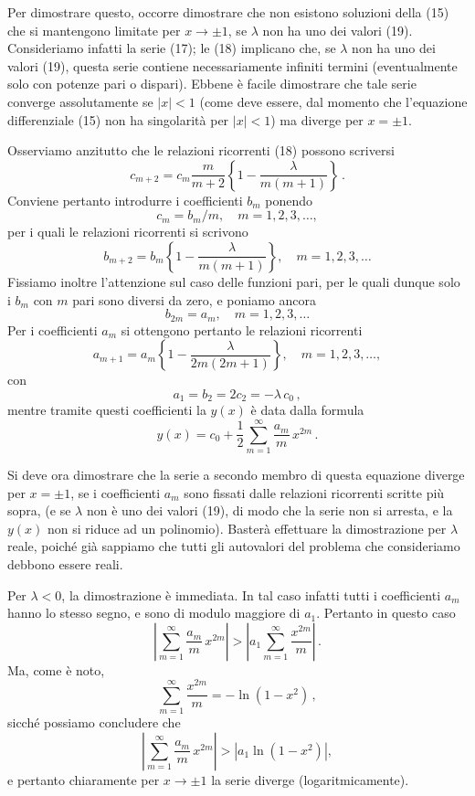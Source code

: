 \documentclass[11pt, a4paper]{book}
\numberwithin{equation}{section}
\begin{document}
Per dimostrare questo, occorre dimostrare che non esistono soluzioni della (15) che si mantengono limitate per $x \to \pm 1$, se $\lambda$
non ha uno dei valori (19). Consideriamo infatti la serie (17); le (18) implicano che, se $\lambda$ non ha uno dei valori (19), questa serie contiene necessariamente infiniti termini (eventualmente solo con potenze pari o dispari). Ebbene è facile dimostrare che tale serie converge assolutamente se
$|x| < 1$ (come deve essere, dal momento che l'equazione differenziale (15) non ha singolarità per $|x| < 1$) ma diverge per $x = \pm 1$.

Osserviamo anzitutto che le relazioni ricorrenti (18) possono scriversi
\[
c_{m+2} = c_m \frac{m}{m+2} \left\{ 1 - \frac{\lambda}{m(m+1)} \right\} \,.
\]
Conviene pertanto introdurre i coefficienti $b_m$ ponendo
\[
c_m = b_m / m, \quad m = 1, 2, 3, \ldots,
\]
per i quali le relazioni ricorrenti si scrivono
\[
b_{m+2} = b_m \left\{ 1 - \frac{\lambda}{m(m+1)} \right\}, \quad m = 1, 2, 3, \ldots
\]
Fissiamo inoltre l'attenzione sul caso delle funzioni pari, per le quali
dunque solo i $b_m$ con $m$ pari sono diversi da zero, e poniamo ancora
\[
b_{2m} = a_m, \quad m = 1, 2, 3, \ldots
\]
Per i coefficienti $a_m$ si ottengono pertanto le relazioni ricorrenti
\begin{equation}
a_{m+1} = a_m \left\{ 1 - \frac{\lambda}{2m(2m+1)} \right\}, \quad m = 1, 2, 3, \ldots, \tag{}
\end{equation}
con
\[
a_1 = b_2 = 2c_2 = -\lambda\, c_0 \,,
\]
mentre tramite questi coefficienti la $y(x)$ è data dalla formula
\[
y(x) = c_0 + \frac{1}{2} \sum_{m=1}^{\infty} \frac{a_m}{m}\, x^{2m} \,.
\]

Si deve ora dimostrare che la serie a secondo membro di
questa equazione diverge per $x = \pm 1$, se i coefficienti $a_m$ sono
fissati dalle relazioni ricorrenti scritte più sopra, (e se $\lambda$ non è
uno dei valori (19), di modo che la serie non si arresta, e la $y(x)$
non si riduce ad un polinomio). Basterà effettuare la dimostrazione
per $\lambda$ reale, poiché già sappiamo che tutti gli autovalori del problema
che consideriamo debbono essere reali.

Per $\lambda < 0$, la dimostrazione è immediata. In tal caso
infatti tutti i coefficienti $a_m$ hanno lo stesso segno, e sono di
modulo maggiore di $a_1$. Pertanto in questo caso
\[
\left| \sum_{m=1}^{\infty} \frac{a_m}{m}\, x^{2m} \right| > \left| a_1 \sum_{m=1}^{\infty} \frac{x^{2m}}{m} \right| \,.
\]
Ma, come è noto,
\[
\sum_{m=1}^{\infty} \frac{x^{2m}}{m} = -\ln(1-x^2) \,,
\]
sicché possiamo concludere che
\[
\left| \sum_{m=1}^{\infty} \frac{a_m}{m}\, x^{2m} \right| > \left| a_1 \ln(1-x^2) \right|,
\]
e pertanto chiaramente per $x \to \pm 1$ la serie diverge (logaritmicamente).
\end{document}
